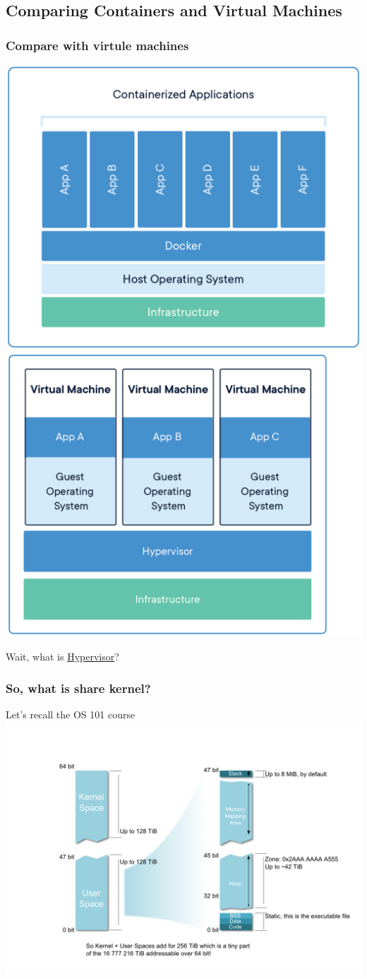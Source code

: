 \documentclass{beamer}
\begin{document}
\subsection{Comparing Containers and Virtual Machines}
\begin{frame}
    \frametitle{Compare with virtule machines}
    \begin{center}
        \includegraphics[width=.49\textwidth]{docker_what_is_container.png}
        \includegraphics[width=.49\textwidth]{container-vm-whatcontainer_2.png}
    \end{center}
    \begin{flushright}
        Wait, what is \hyperlink{HYPERVISOR}{Hypervisor}?
    \end{flushright}
\end{frame}

\begin{frame}
    \frametitle{So, what is share kernel?}
    \begin{center}
        Let's recall the OS 101 course\\
        \includegraphics[width=.8\textwidth]{linux_memory_layout_64bit.png}
        \cite{64_mem_layout}
    \end{center}
\end{frame}
\end{document}
